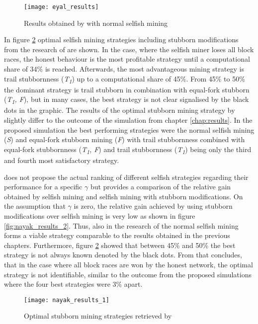 \begin{figure}[t]
\texttt{[image: eyal\_results]}
\centering
\caption{Results obtained by \cite{eyal2014majority} with normal selfish mining}
\label{fig:eyal_results}
\end{figure}

In figure \ref{fig:nayak_results_1} optimal selfish mining strategies including stubborn modifications from the research of \cite{nayak2016stubborn} are shown.
In the case, where the selfish miner loses all block races, the honest behaviour is the most profitable strategy until a computational share of 34\% is reached.
Afterwards, the most advantageous mining strategy is trail stubbornness (\textit{T\textsubscript{1}}) up to a computational share of 45\%.
From 45\% to 50\% the dominant strategy is trail stubborn in combination with equal-fork stubborn (\textit{T\textsubscript{1}, F}), but in many cases, the best strategy is not clear signalised by the black dots in the graphic.
The results of the optimal stubborn mining strategy by \cite{nayak2016stubborn} slightly differ to the outcome of the simulation from chapter \ref{chap:results}.
In the proposed simulation the best performing strategies were the normal selfish mining (\textit{S}) and equal-fork stubborn mining (\textit{F}) with trail stubbornness combined with equal-fork stubbornness (\textit{T\textsubscript{1}, F}) and trail stubbornness (\textit{T\textsubscript{1}}) being only the third and fourth most satisfactory strategy.

\cite{nayak2016stubborn} does not propose the actual ranking of different selfish strategies regarding their performance for a specific $\gamma$ but provides a comparison of the relative gain obtained by selfish mining and selfish mining with stubborn modifications.
On the assumption that $\gamma$ is zero, the relative gain achieved by using stubborn modifications over selfish mining is very low as shown in figure \ref{fig:nayak_results_2}.
Thus, also in the research of \cite{nayak2016stubborn} the normal selfish mining forms a viable strategy comparable to the results obtained in the previous chapters.
Furthermore, figure \ref{fig:nayak_results_1} showed that between 45\% and 50\% the best strategy is not always known denoted by the black dots.
From that concludes, that in the case where all block races are won by the honest network, the optimal strategy is not identifiable, similar to the outcome from the proposed simulations where the four best strategies were 3\% apart.

\begin{figure}[t]
\texttt{[image: nayak\_results\_1]}
\centering
\caption{Optimal stubborn mining strategies retrieved by \cite{nayak2016stubborn}}
\label{fig:nayak_results_1}
\end{figure}

